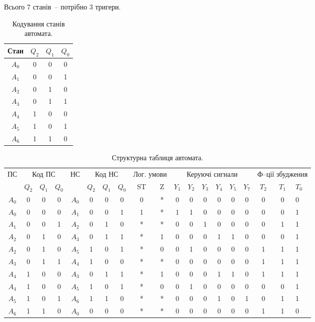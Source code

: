 \documentclass[a4paper, 10pt]{article}
\begin{document}
Всього 7 станів~-- потрібно 3 тригери.
\begin{table}[h!]
\centering
\begin{tabular}{|c|c|c|c|}
\hline
Стан & $Q_2$ & $Q_1$ & $Q_0$ \\
\hline
$A_0$ & 0 & 0 & 0 \\
\hline
$A_1$ & 0 & 0 & 1 \\
\hline
$A_2$ & 0 & 1 & 0 \\
\hline
$A_3$ & 0 & 1 & 1 \\
\hline
$A_4$ & 1 & 0 & 0 \\
\hline
$A_5$ & 1 & 0 & 1 \\
\hline
$A_6$ & 1 & 1 & 0 \\
\hline
\end{tabular}
\caption{Кодування станів автомата.}
\end{table}

\begin{table}[H]
\centering
{\small
\begin{tabular}{|c||c|c|c||c||c|c|c||c|c||c|c|c|c|c|c||c|c|l|}
\hline
\multirow{2}{*}{ПС} &
\multicolumn{3}{|c||}{Код ПС} &
\multirow{2}{*}{НС} &
\multicolumn{3}{|c||}{Код НС} &
\multicolumn{2}{|c||}{Лог. умови} &
\multicolumn{6}{|c||}{Керуючі сигнали} &
\multicolumn{3}{|c|}{Ф--ції збудження} \\
\cline{2-4} \cline{6-19}
  & $Q_2$ & $Q_1$ & $Q_0$ & & $Q_2$ & $Q_1$ & $Q_0$ & ST & Z & $Y_1$ & $Y_2$ & $Y_3$ & $Y_4$ & $Y_5$ & $Y_7$ & $T_2$ & $T_1$ & $T_0$ \\
\hline
\hline
$A_0$ & 0 & 0 & 0 & $A_0$ & 0 & 0 & 0 & 0 & * & 0 & 0 & 0 & 0 & 0 & 0 & 0 & 0 & 0 \\
\hline
$A_0$ & 0 & 0 & 0 & $A_1$ & 0 & 0 & 1 & 1 & * & 1 & 1 & 0 & 0 & 0 & 0 & 0 & 0 & 1 \\
\hline
$A_1$ & 0 & 0 & 1 & $A_2$ & 0 & 1 & 0 & * & * & 0 & 0 & 1 & 0 & 0 & 0 & 0 & 1 & 1 \\
\hline
$A_2$ & 0 & 1 & 0 & $A_3$ & 0 & 1 & 1 & * & 1 & 0 & 0 & 0 & 1 & 1 & 0 & 0 & 0 & 1 \\
\hline
$A_2$ & 0 & 1 & 0 & $A_5$ & 1 & 0 & 1 & * & 0 & 0 & 1 & 0 & 0 & 0 & 0 & 1 & 1 & 1 \\
\hline
$A_3$ & 0 & 1 & 1 & $A_4$ & 1 & 0 & 0 & * & * & 0 & 0 & 0 & 0 & 0 & 0 & 1 & 1 & 1 \\
\hline
$A_4$ & 1 & 0 & 0 & $A_3$ & 0 & 1 & 1 & * & 1 & 0 & 0 & 0 & 1 & 1 & 0 & 1 & 1 & 1 \\
\hline
$A_4$ & 1 & 0 & 0 & $A_5$ & 1 & 0 & 1 & * & 0 & 0 & 1 & 0 & 0 & 0 & 0 & 0 & 0 & 1 \\
\hline
$A_5$ & 1 & 0 & 1 & $A_6$ & 1 & 1 & 0 & * & * & 0 & 0 & 0 & 1 & 0 & 1 & 0 & 1 & 1 \\
\hline
$A_6$ & 1 & 1 & 0 & $A_0$ & 0 & 0 & 0 & * & * & 0 & 0 & 0 & 0 & 0 & 0 & 1 & 1 & 0 \\
\hline
\end{tabular}
}
\caption{Структурна таблиця автомата.}
\end{table}
\end{document}
